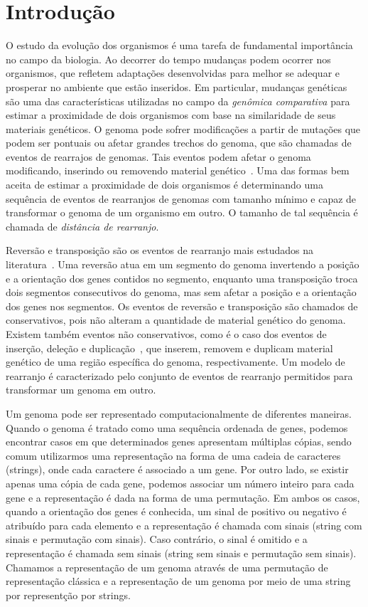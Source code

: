 \chapter{Introdução}\label{chapter:XDSEJBWV}

O estudo da evolução dos organismos é uma tarefa de fundamental importância no campo da biologia. Ao decorrer do tempo mudanças podem ocorrer nos organismos, que refletem adaptações desenvolvidas para melhor se adequar e prosperar no ambiente que estão inseridos. Em particular, mudanças genéticas são uma das características utilizadas no campo da \emph{genômica comparativa} para estimar a proximidade de dois organismos com base na similaridade de seus materiais genéticos. O genoma pode sofrer modificações a partir de mutações que podem ser pontuais ou afetar grandes trechos do genoma, que são chamadas de eventos de rearrajos de genomas. Tais eventos podem afetar o genoma modificando, inserindo ou removendo material genético~\cite{2009-fertin-etal}. Uma das formas bem aceita de estimar a proximidade de dois organismos é determinando uma sequência de eventos de rearranjos de genomas com tamanho mínimo e capaz de transformar o genoma de um organismo em outro. O tamanho de tal sequência é chamada de \emph{distância de rearranjo}.

Reversão e transposição são os eventos de rearranjo mais estudados na literatura~\cite{1999-hannenhalli-pevzner,1999-caprara,2012-bulteau-etal,2019b-oliveira-etal}. Uma reversão atua em um segmento do genoma invertendo a posição e a orientação dos genes contidos no segmento, enquanto uma transposição troca dois segmentos consecutivos do genoma, mas sem afetar a posição e a orientação dos genes nos segmentos. Os eventos de reversão e transposição são chamados de conservativos, pois não alteram a quantidade de material genético do genoma. Existem também eventos não conservativos, como é o caso dos eventos de inserção, deleção e duplicação~\cite{2013-willing-etal,2012-elmabrouk-sankoff,2008-kahn-raphael,2020-mane-etal,2009-bader}, que inserem, removem e duplicam material genético de uma região específica do genoma, respectivamente. Um modelo de rearranjo é caracterizado pelo conjunto de eventos de rearranjo permitidos para transformar um genoma em outro.

Um genoma pode ser representado computacionalmente de diferentes maneiras. Quan\-do o genoma é tratado como uma sequência ordenada de genes, podemos encontrar casos em que determinados genes apresentam múltiplas cópias, sendo comum utilizarmos uma representação na forma de uma cadeia de caracteres (strings), onde cada caractere é associado a um gene. Por outro lado, se existir apenas uma cópia de cada gene, podemos associar um número inteiro para cada gene e a representação é dada na forma de uma permutação. Em ambos os casos, quando a orientação dos genes é conhecida, um sinal de positivo ou negativo é atribuído para cada elemento e a representação é chamada com sinais (string com sinais e permutação com sinais). Caso contrário, o sinal é omitido e a representação é chamada sem sinais (string sem sinais e permutação sem sinais). Chamamos a representação de um genoma através de uma permutação de representação clássica e a representação de um genoma por meio de uma string por representção por strings.

